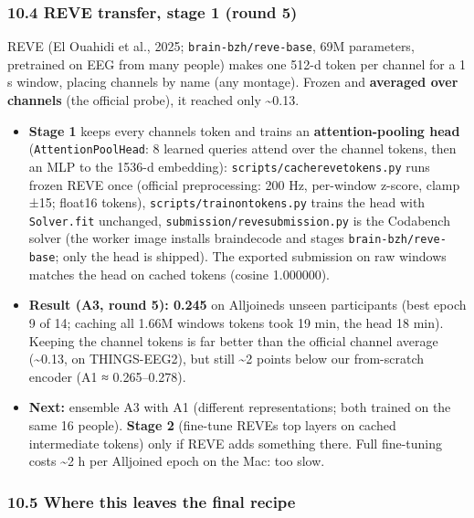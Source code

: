 \documentclass[
  11pt,
]{article}
\providecommand{\tightlist}{%
  \setlength{\itemsep}{0pt}\setlength{\parskip}{0pt}}
\renewcommand{\_}{\oldunderscore\allowbreak}
\begin{document}
\subsubsection{10.4 REVE transfer, stage
1 (round
5)}\label{reve-transfer-stage-1-round-5}

REVE (El Ouahidi et al., 2025;
\texttt{brain-bzh/reve-base}, 69M
parameters, pretrained on EEG from many
people) makes one 512-d token per
channel for a 1 s window, placing
channels by name (any montage). Frozen
and \textbf{averaged over channels} (the
official probe), it reached only
\textasciitilde0.13.

\begin{itemize}
\tightlist
\item
  \textbf{Stage 1} keeps every
  channel\textquotesingle s token and
  trains an \textbf{attention-pooling
  head} (\texttt{AttentionPoolHead}: 8
  learned queries attend over the
  channel tokens, then an MLP to the
  1536-d embedding):
  \texttt{scripts/cache\_reve\_tokens.py}
  runs frozen REVE once (official
  preprocessing: 200 Hz, per-window
  z-score, clamp ±15; float16 tokens),
  \texttt{scripts/train\_on\_tokens.py}
  trains the head with
  \texttt{Solver.fit} unchanged,
  \texttt{submission/reve\_submission.py}
  is the Codabench solver (the worker
  image installs braindecode and stages
  \texttt{brain-bzh/reve-base}; only the
  head is shipped). The exported
  submission on raw windows matches the
  head on cached tokens (cosine
  1.000000).
\item
  \textbf{Result (A3, round 5): 0.245}
  on Alljoined\textquotesingle s unseen
  participants (best epoch 9 of 14;
  caching all 1.66M
  windows\textquotesingle{} tokens took
  19 min, the head 18 min). Keeping the
  channel tokens is far better than the
  official channel average
  (\textasciitilde0.13, on THINGS-EEG2),
  but still \textasciitilde2 points
  below our from-scratch encoder (A1 ≈
  0.265--0.278).
\item
  \textbf{Next:} ensemble A3 with A1
  (different representations; both
  trained on the same 16 people).
  \textbf{Stage 2} (fine-tune
  REVE\textquotesingle s top layers on
  cached intermediate tokens) only if
  REVE adds something there. Full
  fine-tuning costs \textasciitilde2 h
  per Alljoined epoch on the Mac: too
  slow.
\end{itemize}

\subsubsection{10.5 Where this leaves
the final
recipe}\label{where-this-leaves-the-final-recipe}
\end{document}
